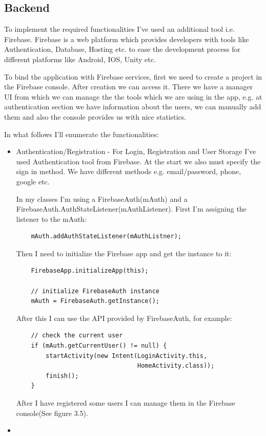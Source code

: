 \subsection{Backend}

To implement the required functionalities I've used an additional tool i.e. Firebase. Firebase is a web platform which provides developers with tools like Authentication, Database, Hosting etc. to ease the development process for different platforms like Android, IOS, Unity etc.

To bind the application with Firebase services, first we need to create a project in the Firebase console. After creation we can access it. There we have a manager UI from which we can manage the the tools which we are using in the app, e.g. at authentication section we have information about the users, we can manually add them and also the console provides us with nice statistics.  

In what follows I'll enumerate the functionalities:

\begin{itemize}
	\item Authentication/Registration - For Login, Registration and User Storage I've used Authentication tool from Firebase. At the start we also must specify the sign in method. We have different methods e.g. email/password, phone, google etc.
	
	In my classes I'm using a FirebaseAuth(mAuth) and a FirebaseAuth.AuthStateListener(mAuthListener). First I'm assigning the listener to the mAuth: 
	\begin{lstlisting}
	mAuth.addAuthStateListener(mAuthListner);
	\end{lstlisting}
	
	Then I need to initialize the Firebase app and get the instance to it:
	\begin{lstlisting}
 	FirebaseApp.initializeApp(this);

	// initialize FirebaseAuth instance
	mAuth = FirebaseAuth.getInstance();
	\end{lstlisting}
	
	After this I can use the API provided by FirebaseAuth, for example:
	\begin{lstlisting}
	// check the current user
	if (mAuth.getCurrentUser() != null) {
		startActivity(new Intent(LoginActivity.this, 
								 HomeActivity.class));
		finish();
	}
	\end{lstlisting}
	
	After I have registered some users I can manage them in the Firebase console(See figure 3.5). 
	\item 
\end{itemize}


